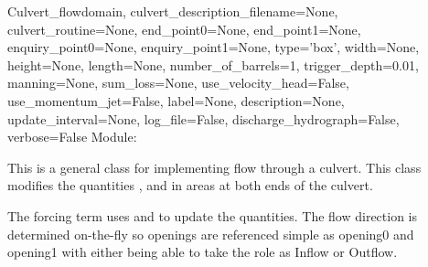 \documentclass{manual}
\begin{document}
\begin{classdesc}{Culvert_flow}{domain,
                 culvert_description_filename=None,
                 culvert_routine=None,
                 end_point0=None,
                 end_point1=None,
                 enquiry_point0=None,
                 enquiry_point1=None,
                 type='box',
                 width=None,
                 height=None,
                 length=None,
                 number_of_barrels=1,
                 trigger_depth=0.01,
                 manning=None,
                 sum_loss=None,
                 use_velocity_head=False,
                 use_momentum_jet=False,
                 label=None,
                 description=None,
                 update_interval=None,
                 log_file=False,
                 discharge_hydrograph=False,
                 verbose=False}
Module: 

This is a general class for implementing flow through a culvert.
This class modifies the quantities ,  and  in areas at both ends of the culvert.

The  forcing term uses  and  to update the quantities.
The flow direction is determined on-the-fly so openings are referenced simple as opening0 and opening1
with either being able to take the role as Inflow or Outflow.


\end{classdesc}
\end{document}
